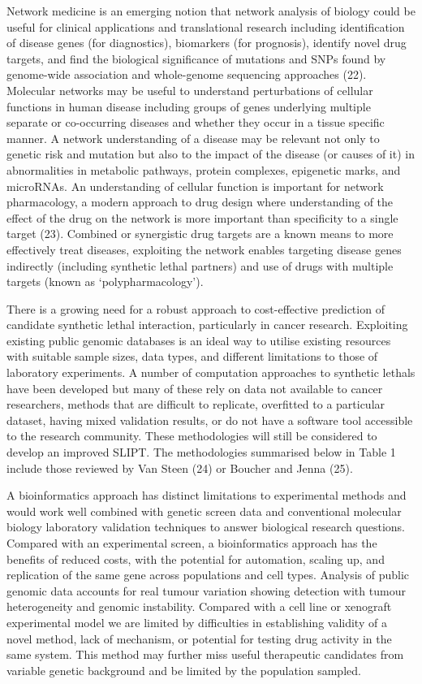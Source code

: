 Network medicine is an emerging notion that network analysis of biology could be useful for clinical applications and translational research including identification of disease genes (for diagnostics), biomarkers (for prognosis), identify novel drug targets, and find the biological significance of mutations and SNPs found by genome-wide association and whole-genome sequencing approaches (22). Molecular networks may be useful to understand perturbations of cellular functions in human disease including groups of genes underlying multiple separate or co-occurring diseases and whether they occur in a tissue specific manner. A network understanding of a disease may be relevant not only to genetic risk and mutation but also to the impact of the disease (or causes of it) in abnormalities in metabolic pathways, protein complexes, epigenetic marks, and microRNAs. An understanding of cellular function is important for network pharmacology, a modern approach to drug design where understanding of the effect of the drug on the network is more important than specificity to a single target (23). Combined or synergistic drug targets are a known means to more effectively treat diseases, exploiting the network enables targeting disease genes indirectly (including \gls{synthetic lethal} partners) and use of drugs with multiple targets (known as ‘polypharmacology’). 

There is a growing need for a robust approach to cost-effective prediction of candidate \gls{synthetic lethal} interaction, particularly in cancer research. Exploiting existing public genomic databases is an ideal way to utilise existing resources with suitable sample sizes, data types, and different limitations to those of laboratory experiments. A number of computation approaches to \glspl{synthetic lethal} have been developed but many of these rely on data not available to cancer researchers, methods that are difficult to replicate, overfitted to a particular dataset, having mixed validation results, or do not have a software tool accessible to the research community. These methodologies will still be considered to develop an improved \gls{SLIPT}. The methodologies summarised below in Table 1 include those reviewed by Van Steen (24) or Boucher and Jenna (25). 

A \gls{bioinformatics} approach has distinct limitations to experimental methods and would work well combined with genetic screen data and conventional molecular biology laboratory validation techniques to answer biological research questions. Compared with an experimental screen, a \gls{bioinformatics} approach has the benefits of reduced costs, with the potential for automation, scaling up, and replication of the same gene across populations and cell types. Analysis of public genomic data accounts for real tumour variation showing detection with tumour heterogeneity and genomic instability. Compared with a cell line or xenograft experimental model we are limited by difficulties in establishing validity of a novel method, lack of mechanism, or potential for testing drug activity in the same system. This method may further miss useful therapeutic candidates from variable genetic background and be limited by the population sampled.

